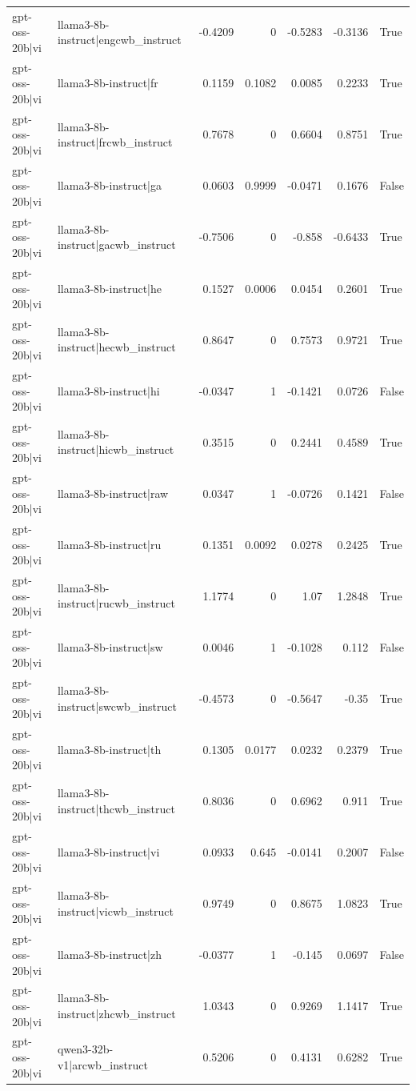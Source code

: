 \begin{table}
\begin{tabular}{l l r r r r l}
gpt-oss-20b|vi & llama3-8b-instruct|engcwb_instruct & -0.4209 & 0 & -0.5283 & -0.3136 & True \\
gpt-oss-20b|vi & llama3-8b-instruct|fr & 0.1159 & 0.1082 & 0.0085 & 0.2233 & True \\
gpt-oss-20b|vi & llama3-8b-instruct|frcwb_instruct & 0.7678 & 0 & 0.6604 & 0.8751 & True \\
gpt-oss-20b|vi & llama3-8b-instruct|ga & 0.0603 & 0.9999 & -0.0471 & 0.1676 & False \\
gpt-oss-20b|vi & llama3-8b-instruct|gacwb_instruct & -0.7506 & 0 & -0.858 & -0.6433 & True \\
gpt-oss-20b|vi & llama3-8b-instruct|he & 0.1527 & 0.0006 & 0.0454 & 0.2601 & True \\
gpt-oss-20b|vi & llama3-8b-instruct|hecwb_instruct & 0.8647 & 0 & 0.7573 & 0.9721 & True \\
gpt-oss-20b|vi & llama3-8b-instruct|hi & -0.0347 & 1 & -0.1421 & 0.0726 & False \\
gpt-oss-20b|vi & llama3-8b-instruct|hicwb_instruct & 0.3515 & 0 & 0.2441 & 0.4589 & True \\
gpt-oss-20b|vi & llama3-8b-instruct|raw & 0.0347 & 1 & -0.0726 & 0.1421 & False \\
gpt-oss-20b|vi & llama3-8b-instruct|ru & 0.1351 & 0.0092 & 0.0278 & 0.2425 & True \\
gpt-oss-20b|vi & llama3-8b-instruct|rucwb_instruct & 1.1774 & 0 & 1.07 & 1.2848 & True \\
gpt-oss-20b|vi & llama3-8b-instruct|sw & 0.0046 & 1 & -0.1028 & 0.112 & False \\
gpt-oss-20b|vi & llama3-8b-instruct|swcwb_instruct & -0.4573 & 0 & -0.5647 & -0.35 & True \\
gpt-oss-20b|vi & llama3-8b-instruct|th & 0.1305 & 0.0177 & 0.0232 & 0.2379 & True \\
gpt-oss-20b|vi & llama3-8b-instruct|thcwb_instruct & 0.8036 & 0 & 0.6962 & 0.911 & True \\
gpt-oss-20b|vi & llama3-8b-instruct|vi & 0.0933 & 0.645 & -0.0141 & 0.2007 & False \\
gpt-oss-20b|vi & llama3-8b-instruct|vicwb_instruct & 0.9749 & 0 & 0.8675 & 1.0823 & True \\
gpt-oss-20b|vi & llama3-8b-instruct|zh & -0.0377 & 1 & -0.145 & 0.0697 & False \\
gpt-oss-20b|vi & llama3-8b-instruct|zhcwb_instruct & 1.0343 & 0 & 0.9269 & 1.1417 & True \\
gpt-oss-20b|vi & qwen3-32b-v1|arcwb_instruct & 0.5206 & 0 & 0.4131 & 0.6282 & True \\

\end{tabular}
\end{table}
